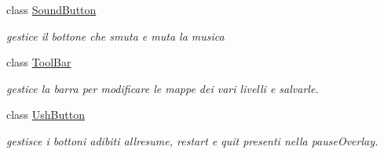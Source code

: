 \begin{DoxyCompactItemize}
class \hyperlink{classui_1_1_sound_button}{Sound\+Button}
\begin{DoxyCompactList}\small\item\em gestice il bottone che smuta e muta la musica \end{DoxyCompactList}\item 
class \hyperlink{classui_1_1_tool_bar}{Tool\+Bar}
\begin{DoxyCompactList}\small\item\em gestice la barra per modificare le mappe dei vari livelli e salvarle. \end{DoxyCompactList}\item 
class \hyperlink{classui_1_1_ush_button}{Ush\+Button}
\begin{DoxyCompactList}\small\item\em gestisce i bottoni adibiti all\textquotesingle{}resume, restart e quit presenti nella pause\+Overlay. \end{DoxyCompactList}\end{DoxyCompactItemize}
